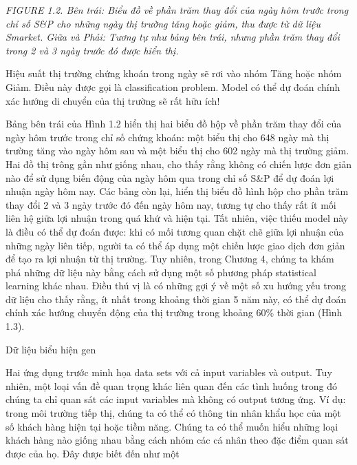 \noindent\textit{FIGURE 1.2. Bên trái: Biểu đồ về phần trăm thay đổi của ngày hôm trước trong chỉ số S\&P cho những ngày thị trường tăng hoặc giảm, thu được từ dữ liệu Smarket. Giữa và Phải: Tương tự như bảng bên trái, nhưng phần trăm thay đổi trong 2 và 3 ngày trước đó được hiển thị.}

Hiệu suất thị trường chứng khoán trong ngày sẽ rơi vào nhóm Tăng hoặc nhóm Giảm. Điều này được gọi là classification problem. Model có thể dự đoán chính xác hướng di chuyển của thị trường sẽ rất hữu ích!

Bảng bên trái của Hình 1.2 hiển thị hai biểu đồ hộp về phần trăm thay đổi của ngày hôm trước trong chỉ số chứng khoán: một biểu thị cho 648 ngày mà thị trường tăng vào ngày hôm sau và một biểu thị cho 602 ngày mà thị trường giảm. Hai đồ thị trông gần như giống nhau, cho thấy rằng không có chiến lược đơn giản nào để sử dụng biến động của ngày hôm qua trong chỉ số S\&P để dự đoán lợi nhuận ngày hôm nay. Các bảng còn lại, hiển thị biểu đồ hình hộp cho phần trăm thay đổi 2 và 3 ngày trước đó đến ngày hôm nay, tương tự cho thấy rất ít mối liên hệ giữa lợi nhuận trong quá khứ và hiện tại. Tất nhiên, việc thiếu model này là điều có thể dự đoán được: khi có mối tương quan chặt chẽ giữa lợi nhuận của những ngày liên tiếp, người ta có thể áp dụng một chiến lược giao dịch đơn giản để tạo ra lợi nhuận từ thị trường. Tuy nhiên, trong Chương 4, chúng ta khám phá những dữ liệu này bằng cách sử dụng một số phương pháp statistical learning khác nhau. Điều thú vị là có những gợi ý về một số xu hướng yếu trong dữ liệu cho thấy rằng, ít nhất trong khoảng thời gian 5 năm này, có thể dự đoán chính xác hướng chuyển động của thị trường trong khoảng 60\% thời gian (Hình 1.3).

Dữ liệu biểu hiện gen

Hai ứng dụng trước minh họa data sets với cả input variables và output. Tuy nhiên, một loại vấn đề quan trọng khác liên quan đến các tình huống trong đó chúng ta chỉ quan sát các input variables mà không có output tương ứng. Ví dụ: trong môi trường tiếp thị, chúng ta có thể có thông tin nhân khẩu học của một số khách hàng hiện tại hoặc tiềm năng. Chúng ta có thể muốn hiểu những loại khách hàng nào giống nhau bằng cách nhóm các cá nhân theo đặc điểm quan sát được của họ. Đây được biết đến như một

